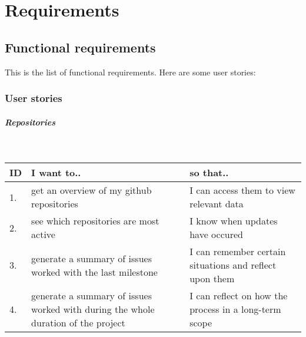\chapter{Requirements}
\label{chap:requirements}
\section{Functional requirements}
This is the list of functional requirements.
Here are some user stories:

\subsection{User stories}
\paragraph{Repositories}\mbox{}\\
\vspace{0.5cm}
 \begin{tabularx}{\linewidth}{| l | X | X |}
    \hline
    \rowcolor[gray]{0.8}
    \textbf{ID} & \textbf{I want to..} & \textbf{so that..} \\
    \hline
    1. & get an overview of my github repositories & I can access them to view relevant data\\
    2. & see which repositories are most active  & I know when updates have occured\\
    3. & generate a summary of issues worked with the last milestone & I can remember certain situations and reflect upon them\\
    4. & generate a summary of issues worked with during the whole duration of the project & I can reflect on how the process in a long-term scope\\
    \hline
\end{tabularx}
\vspace{0.5cm}

